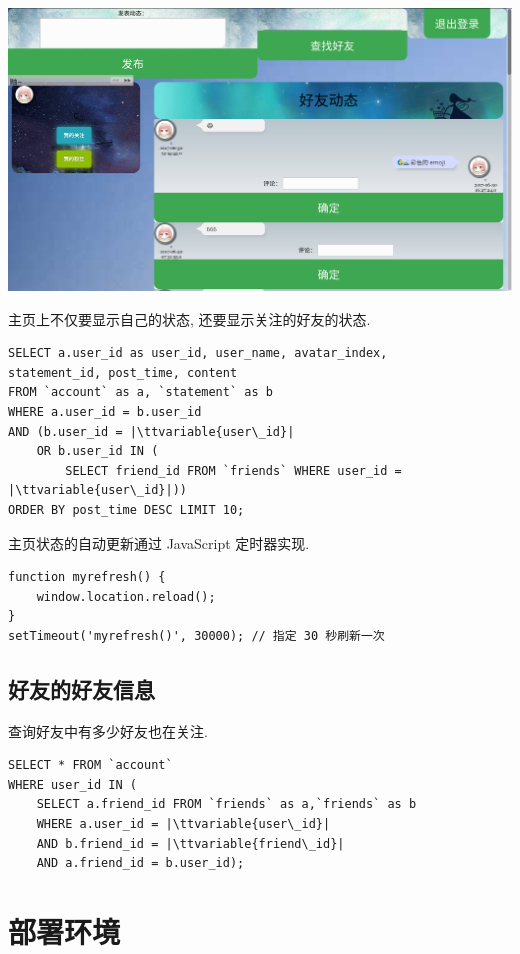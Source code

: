 \documentclass[a4paper,10pt]{article}
\newcommand{\ttvariable}[1]{\texttt{\textit{#1}}}
\begin{document}
\begin{center}
	\includegraphics[scale=0.25]{homepage.png}
\end{center}

主页上不仅要显示自己的状态, 还要显示关注的好友的状态.
\begin{verbatim}
SELECT a.user_id as user_id, user_name, avatar_index,
statement_id, post_time, content
FROM `account` as a, `statement` as b
WHERE a.user_id = b.user_id
AND (b.user_id = |\ttvariable{user\_id}|
    OR b.user_id IN (
        SELECT friend_id FROM `friends` WHERE user_id = |\ttvariable{user\_id}|))
ORDER BY post_time DESC LIMIT 10;
\end{verbatim}

主页状态的自动更新通过 JavaScript 定时器实现.
\begin{verbatim}
function myrefresh() {
    window.location.reload();
}
setTimeout('myrefresh()', 30000); // 指定 30 秒刷新一次
\end{verbatim}

\subsection{好友的好友信息}

查询好友中有多少好友也在关注.
\begin{verbatim}
SELECT * FROM `account`
WHERE user_id IN (
    SELECT a.friend_id FROM `friends` as a,`friends` as b
    WHERE a.user_id = |\ttvariable{user\_id}|
    AND b.friend_id = |\ttvariable{friend\_id}|
    AND a.friend_id = b.user_id);
\end{verbatim}

\section{部署环境}
\end{document}
